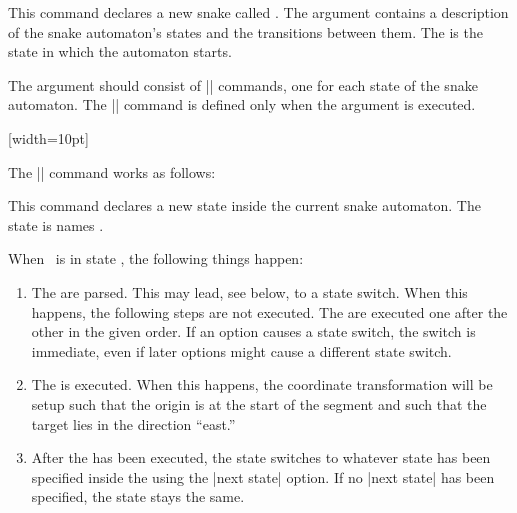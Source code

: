 \begin{command}{\pgfdeclaresnake{}}
  This command declares a new snake called . The
   argument contains a description of the snake
  automaton's states and the transitions between them. The
   is the state in which the automaton starts.

  The  argument should consist of |\state| commands, one
  for each state of the snake automaton. The |\state| command is
  defined only when the  argument is executed.

\begin{codeexample}[]
{
  [width=10pt]
  {
    \pgfpathlineto{\pgfpoint{0pt}{5pt}}
    \pgfpathlineto{\pgfpoint{5pt}{5pt}}
    \pgfpathlineto{\pgfpoint{5pt}{-5pt}}
    \pgfpathlineto{\pgfpoint{10pt}{-5pt}}
    \pgfpathlineto{\pgfpoint{10pt}{0pt}}
  }
  {
    \pgfpathlineto{\pgfpoint{\pgfsnakeremainingdistance}{0pt}}
  }
}
\end{codeexample}

 The |\state| command works as follows:
  \begin{command}{\state{}}
    This command declares a new state inside the current snake
    automaton. The state is names .

    When \pgfname\ is in state , the following things
    happen:
    \begin{enumerate}
    \item
      The  are parsed. This may lead, see below, to a 
      state switch. When this happens, the following steps are not
      executed. The  are executed one after the other in
      the given order. If an option causes a state switch, the switch
      is immediate, even if later options might cause a different
      state switch.
    \item
      The  is executed. When this happens, the coordinate
      transformation will be setup such that the origin is at the
      start of the segment and such that the target lies in the
      direction ``east.''
    \item
      After the  has been executed, the state switches to
      whatever state has been specified inside the 
      using the |next state| option. If no |next state| has been
      specified, the state stays the same.
    \end{enumerate}


\end{command}
\end{command}
